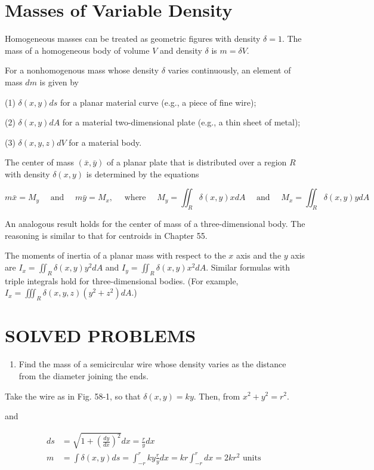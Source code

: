 \documentclass[10pt]{article}
\begin{document}
\section*{Masses of Variable Density}
Homogeneous masses can be treated as geometric figures with density $\delta=1$. The mass of a homogeneous body of volume $V$ and density $\delta$ is $m=\delta V$.

For a nonhomogenous mass whose density $\delta$ varies continuously, an element of mass $d m$ is given by

(1) $\delta(x, y) d s$ for a planar material curve (e.g., a piece of fine wire);

(2) $\delta(x, y) d A$ for a material two-dimensional plate (e.g., a thin sheet of metal);

(3) $\delta(x, y, z) d V$ for a material body.

The center of mass $(\bar{x}, \bar{y})$ of a planar plate that is distributed over a region $R$ with density $\delta(x, y)$ is determined by the equations

$$
m \bar{x}=M_{y} \quad \text { and } \quad m \bar{y}=M_{x}, \quad \text { where } \quad M_{y}=\iint_{R} \delta(x, y) x d A \quad \text { and } \quad M_{x}=\iint_{R} \delta(x, y) y d A
$$

An analogous result holds for the center of mass of a three-dimensional body. The reasoning is similar to that for centroids in Chapter 55.

The moments of inertia of a planar mass with respect to the $x$ axis and the $y$ axis are $I_{x}=\iint_{R} \delta(x, y) y^{2} d A$ and $I_{y}=\iint_{R} \delta(x, y) x^{2} d A$. Similar formulas with triple integrals hold for three-dimensional bodies. (For example, $I_{x}=\iiint_{R} \delta(x, y, z)\left(y^{2}+z^{2}\right) d A$.)

\section*{SOLVED PROBLEMS}
\begin{enumerate}
  \item Find the mass of a semicircular wire whose density varies as the distance from the diameter joining the ends.
\end{enumerate}

Take the wire as in Fig. 58-1, so that $\delta(x, y)=k y$. Then, from $x^{2}+y^{2}=r^{2}$.

and

$$
\begin{aligned}
d s & =\sqrt{1+\left(\frac{d y}{d x}\right)^{2}} d x=\frac{r}{y} d x \\
m & =\int \delta(x, y) d s=\int_{-r}^{r} k y \frac{r}{y} d x=k r \int_{-r}^{r} d x=2 k r^{2} \text { units }
\end{aligned}
$$
\end{document}

